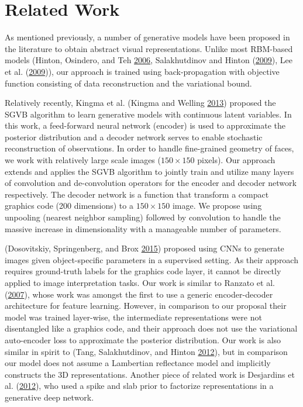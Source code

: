 \documentclass[12pt,twoside]{mitthesis}
\begin{document}
\section{Related Work}\label{related-work}

As mentioned previously, a number of generative models have been
proposed in the literature to obtain abstract visual representations.
Unlike most RBM-based models (Hinton, Osindero, and Teh
\protect\hyperlink{ref-hinton2006fast}{2006}, Salakhutdinov and Hinton
(\protect\hyperlink{ref-salakhutdinov2009deep}{2009}), Lee et al.
(\protect\hyperlink{ref-lee2009convolutional}{2009})), our approach is
trained using back-propagation with objective function consisting of
data reconstruction and the variational bound.

Relatively recently, Kingma et al. (Kingma and Welling
\protect\hyperlink{ref-kingma2013auto}{2013}) proposed the SGVB
algorithm to learn generative models with continuous latent variables.
In this work, a feed-forward neural network (encoder) is used to
approximate the posterior distribution and a decoder network serves to
enable stochastic reconstruction of observations. In order to handle
fine-grained geometry of faces, we work with relatively large scale
images (\(150 \times 150\) pixels). Our approach extends and applies the
SGVB algorithm to jointly train and utilize many layers of convolution
and de-convolution operators for the encoder and decoder network
respectively. The decoder network is a function that transform a compact
graphics code (200 dimensions) to a \(150 \times 150\) image. We propose
using unpooling (nearest neighbor sampling) followed by convolution to
handle the massive increase in dimensionality with a manageable number
of parameters.

(Dosovitskiy, Springenberg, and Brox
\protect\hyperlink{ref-dosovitskiy2015learning}{2015}) proposed using
CNNs to generate images given object-specific parameters in a supervised
setting. As their approach requires ground-truth labels for the graphics
code layer, it cannot be directly applied to image interpretation tasks.
Our work is similar to Ranzato et al.
(\protect\hyperlink{ref-ranzato2007unsupervised}{2007}), whose work was
amongst the first to use a generic encoder-decoder architecture for
feature learning. However, in comparison to our proposal their model was
trained layer-wise, the intermediate representations were not
disentangled like a graphics code, and their approach does not use the
variational auto-encoder loss to approximate the posterior distribution.
Our work is also similar in spirit to (Tang, Salakhutdinov, and Hinton
\protect\hyperlink{ref-tang2012deep}{2012}), but in comparison our model
does not assume a Lambertian reflectance model and implicitly constructs
the 3D representations. Another piece of related work is Desjardins et
al. (\protect\hyperlink{ref-desjardins2012disentangling}{2012}), who
used a spike and slab prior to factorize representations in a generative
deep network.
\end{document}
